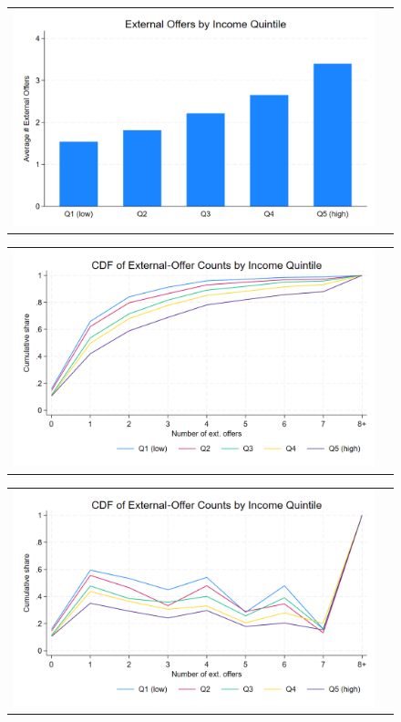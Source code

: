 \documentclass[12pt]{article}
\begin{document}
\begin{figure}[H] \label{fig:ie2_}
\caption{}
\centering{}%
\begin{tabular}{cc}
\includegraphics[scale=0.27]{figures/IE2_search_by_income_quintile.png}
\end{tabular}
\end{figure}
\begin{figure}[H] \label{fig:ie2_}
\caption{}
\centering{}%
\begin{tabular}{cc}
\includegraphics[scale=0.27]{figures/IE2_search_CDF_by_income_quintile.png}
\end{tabular}
\end{figure}
\begin{figure}[H] \label{fig:ie2_}
\caption{}
\centering{}%
\begin{tabular}{cc}
\includegraphics[scale=0.27]{figures/IE2_search_hazardrate_by_income_quintile.png}
\end{tabular}
\end{figure}
\end{document}
